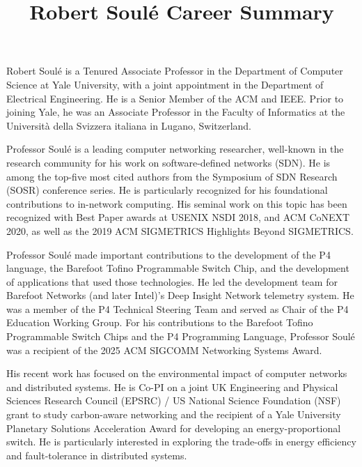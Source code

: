 \documentclass[11pt]{article}
\title{ Robert Soul\'{e} Career Summary}
\author{  }
\date{ }
\begin{document}
\maketitle	
\thispagestyle{empty}


Robert Soul\'{e} is a Tenured Associate Professor in the Department of
Computer Science at Yale University, with a joint appointment in the
Department of Electrical Engineering. He is a Senior Member of 
the ACM and IEEE.  Prior to joining Yale, he was an Associate
Professor in the Faculty of Informatics at the Universit\`{a} della
Svizzera italiana in Lugano, Switzerland.




Professor Soul\'{e} is a leading computer networking researcher, well-known in the research community
for his work on software-defined networks (SDN). He is among the
top-five most cited authors from the Symposium of SDN Research (SOSR)
conference series. He is particularly recognized for his foundational
contributions to in-network computing. His seminal work on this topic has
been recognized with Best Paper awards at USENIX NSDI 2018, and ACM CoNEXT 2020,
as well as the 2019 ACM SIGMETRICS Highlights Beyond SIGMETRICS.



Professor Soul\'{e} made important contributions to the development of the P4
language, the Barefoot Tofino Programmable Switch Chip,
and the development of applications that used those
technologies. He led
the development team for Barefoot Networks (and later Intel)'s Deep
Insight Network telemetry system. He was a member of the
P4 Technical Steering Team and served as Chair of the P4 Education
Working Group. For his contributions to the Barefoot Tofino
Programmable Switch Chips and the P4 Programming Language, Professor
Soul\'{e} was a recipient of the 2025 ACM SIGCOMM Networking Systems
Award.

His recent work has focused on the environmental impact of computer networks
and distributed systems. He is Co-PI on a joint UK Engineering and
Physical Sciences Research Council (EPSRC) / US National Science Foundation (NSF) grant to study carbon-aware networking and the recipient of
a Yale University Planetary Solutions Acceleration Award for developing
an energy-proportional switch. He is particularly interested in exploring
the trade-offs in energy efficiency and fault-tolerance in distributed systems.
\end{document}
